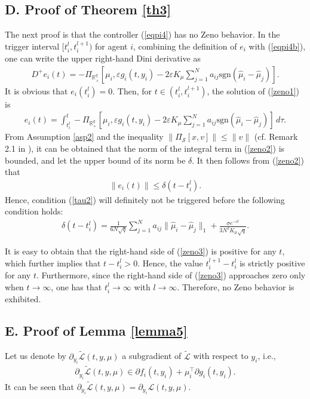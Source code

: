 \documentclass[final,5p,times,twocolumn,authoryear]{elsarticle}
\newcommand{\sign}[1]{\mathrm{sgn}(#1)}
\begin{document}
	\subsection*{{D.} Proof of Theorem \ref{th3}}	\label{pth3}
	The next proof is that the controller (\ref{eqpi4}) has no Zeno behavior.	
	In the trigger interval $[t_i^l,t_i^{l+1})$ for agent $i$, combining the definition of $e_i$ with (\ref{eqpi4b}), one can write the upper right-hand Dini derivative as
	\begin{align}
		D^+ e_i(t){=} - \!\Pi_{\mathbb{R}_+^q}[\mu_i, \varepsilon g_i(t,y_i) {-}2\varepsilon K_\mu \sum_{j=1}^N a_{ij}\sign{\hat\mu_i{-}\hat\mu_j}].\label{zeno1}
	\end{align}
	It is obvious that $e_i(t_i^l)=0$. Then, for $t\in (t_i^l,t_i^{l+1})$, the solution of (\ref{zeno1}) is
	\begin{align}
		e_i(t){=} \!\int_{t_i^l}^{t} \!- \!\Pi_{\mathbb{R}_+^q}[\mu_i, \varepsilon g_i(t,y_i) {-}2\varepsilon K_\mu \sum_{j=1}^N a_{ij}\sign{\hat\mu_i{-}\hat\mu_j}] \,d\tau. \label{zeno2}
	\end{align}
	From Assumption \ref{asp2} and the inequality $\|\Pi_{\mathcal{S}}[x,v]\|\le\|v\|$ (cf. Remark 2.1 in \citet{zhang1995}), it can be obtained that the norm of the integral term in (\ref{zeno2}) is bounded, and let the upper bound of its norm be $\delta$.  It then follows from (\ref{zeno2}) that
	\begin{align}
		\|e_i(t)\| \le \delta(t-t_i^l).
	\end{align} 
	Hence, condition (\ref{tau2}) will definitely not be triggered before the following  condition holds:
	\begin{align}
		\delta(t-t_i^l)=\frac{1}{6N\sqrt{q}}\sum_{j=1}^N a_{ij} \|\hat\mu_i-\hat\mu_j\|_1 {+} \frac{\sigma e^{-\iota t}}{3N^2K_\mu\sqrt{q}} .\label{zeno3}
	\end{align}
	
	It is easy to obtain that the right-hand side of (\ref{zeno3}) is positive for any $t$,  which further implies that $t-t_i^l>0$. Hence, the value $t_i^{l+1}-t_i^l$ is strictly positive for any $t$. Furthermore, since the right-hand side of (\ref{zeno3}) approaches zero only when $t\to\infty$, one has that $t_i^l\to\infty$ with $l\to\infty$. Therefore, no Zeno behavior is exhibited.
	
	
	\subsection*{{E.} Proof of Lemma \ref{lemma5}}\label{ple5}
	Let us	denote by $ \partial_{y_i}\mathcal{\tilde{L}}(t,y,\mu)$ a subgradient of $\mathcal{\tilde{L}}$ with respect to $y_i$, i.e.,
	\begin{align}
		 \partial_{y_i}\mathcal{\tilde{L}}(t,y,\mu)\in \partial f_i(t,y_i)+\mu_i^\top \partial g_i(t,y_i).\label{lany}
	\end{align}
	It can be seen that $ \partial_{y_i}\mathcal{\tilde{L}}(t,y,\mu)= \partial_{y_i} \mathcal{{L}}(t,y,\mu)$.
	
\end{document}
